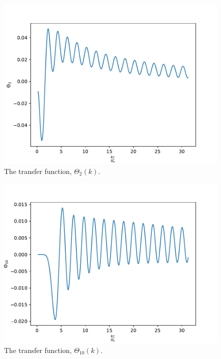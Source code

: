 \documentclass{aa}
\begin{document}
\begin{figure}[h!]
   \includegraphics[scale=0.6]{../figures/milestone4/theta_2.pdf}
   \caption{The transfer function, $\Theta_2(k)$.}\label{fig:m4_theta2}
\end{figure}

\begin{figure}[h!]
   \includegraphics[scale=0.6]{../figures/milestone4/theta_10.pdf}
   \caption{The transfer function, $\Theta_{10}(k)$.}\label{fig:m4_theta10}
\end{figure}
\end{document}

